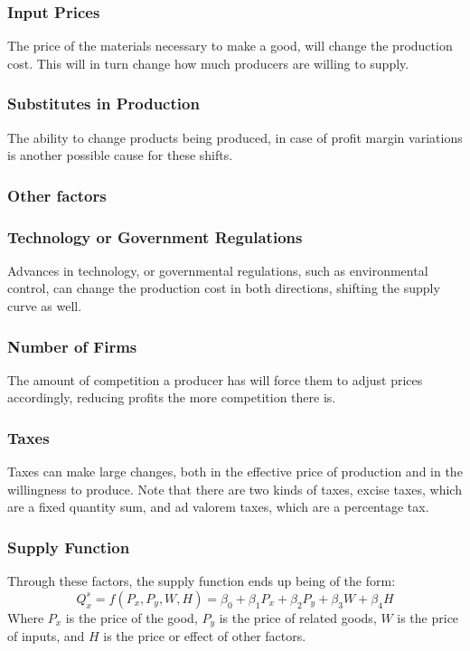 \documentclass[nobib]{article}
\begin{document}
\subsubsection{Input Prices}
The price of the materials necessary to make a good, will change the production
cost. This will in turn change how much producers are willing to supply.
\subsubsection{Substitutes in Production}
The ability to change products being produced, in case of profit margin
variations is another possible cause for these shifts.
\subsubsection{Other factors}
\subsubsection*{Technology or Government Regulations}
Advances in technology, or governmental regulations, such as environmental control, can change the production cost in both directions, shifting the supply curve as well.
\subsubsection*{Number of Firms}
The amount of competition a producer has will force them to adjust prices accordingly, reducing profits the more competition there is.
\subsubsection*{Taxes}
Taxes can make large changes, both in the effective price of production and in the willingness to produce. Note that there are two kinds of taxes, excise taxes, which are a fixed quantity sum, and ad valorem taxes, which are a percentage tax.
\subsubsection{Supply Function}
Through these factors, the supply function ends up being of the form:
\begin{equation*}
    Q_x^s = f(P_x, P_y, W, H) = \beta_0 + \beta_1 P_x+ \beta_2 P_y + \beta_3 W + \beta_4 H
\end{equation*}
Where $P_x$ is the price of the good, $P_y$ is the price of related goods, $W$ is the price of inputs, and $H$ is the price or effect of other factors.
\end{document}
